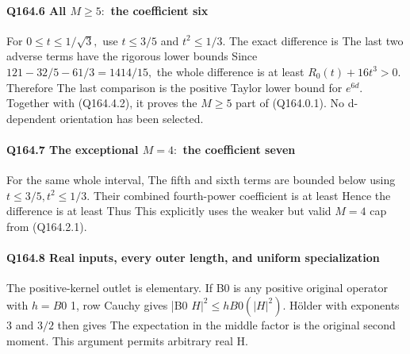 \paragraph{Q164.6 All \(M\ge 5:\) the coefficient six}

For \(0\le t\le 1/\sqrt{3},\allowbreak \) use \(t\le 3/5\) and \(t^2\le 1/3.\) The exact difference is
The last two adverse terms have the rigorous lower bounds
Since \(121-32/5-61/3=1414/15,\allowbreak \) the whole difference is at least
\(R_0(t)+16t^3>0.\) Therefore
The last comparison is the positive Taylor lower bound for \(e^{6d}.\)
Together with (Q164.4.2), it proves the \(M\ge 5\) part of (Q164.0.1).
No d-dependent orientation has been selected.

\paragraph{Q164.7 The exceptional \(M=4:\) the coefficient seven}

For the same whole interval,
The fifth and sixth terms are bounded below using \(t\le 3/5,\allowbreak  t^2\le 1/3.\) Their combined fourth-power coefficient is at least
Hence the difference is at least
Thus
This explicitly uses the weaker but valid \(M=4\) cap from (Q164.2.1).


\paragraph{Q164.8 Real inputs, every outer length, and uniform specialization}

The positive-kernel outlet is elementary. If B0 is
any positive original operator with \(h=B0\) 1, row Cauchy gives
|B0 \(H|^2\le h B0(|H|^2).\) Hölder with exponents 3 and \(3/2\) then gives
The expectation in the middle factor is the original second moment.
This argument permits arbitrary real H.

